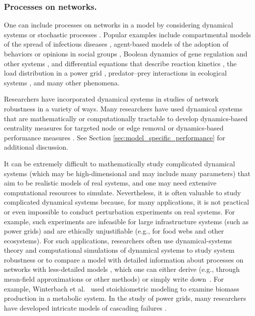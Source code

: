 \documentclass{comnet-mod}
\begin{document}
\subsubsection{Processes on networks.} 

One can include processes on networks in a model by considering dynamical systems or stochastic processes \cite{Porter2016}. Popular examples include compartmental models of the spread of infectious diseases \cite{Pastor-Satorras2015}, agent-based models of the adoption of behaviors or opinions in social groups \cite{noor2020}, Boolean dynamics of gene regulation and other systems \cite{Albert2004a, Schwab2020} ,
and differential equations that describe reaction kinetics \cite{Winterbach2011}, the load distribution in a power grid \cite{Cuadra2015}, predator--prey interactions in ecological systems \cite{Jordan2004}, and many other phenomena. 

Researchers have incorporated dynamical systems in studies of network robustness in a variety of ways. Many researchers have used dynamical systems that are mathematically or computationally tractable to develop dynamics-based centrality measures \cite{Freeman1991, Brandes2005, Newman2005, Konschake2013} for targeted node or edge removal or dynamics-based performance measures \cite{Wu2010, Ellens2011, Schwab2020}. 
See Section \ref{sec:model_specific_performance} for additional discussion.

It can be extremely difficult to mathematically study complicated dynamical systems (which may be high-dimensional and may include many parameters) that aim to be realistic models of real systems, and one may need extensive
 computational resources to simulate. Nevertheless, it is often valuable to 
 study complicated dynamical systems because, for many applications, it is not practical or even impossible to conduct perturbation experiments on real systems. For example, such experiments are infeasible for large infrastructure systems (such as power grids)
 and are ethically unjustifiable (e.g., for food webs and other ecosystems). 
For such applications, researchers often use dynamical-systems theory \cite{May1972, Allesina2012, Medeiros2021} and computational simulations of dynamical systems to study system robustness \cite{Carreras2002, Nedic2006, Carreras2013, Rezaei2014, Henneaux2015, Song2015} or to compare a model with detailed information about processes on networks with less-detailed models \cite{Winterbach2011, Cuadra2015}, which one can either derive (e.g., through mean-field approximations or other methods) or simply write down~\cite{Porter2016}. For example, Winterbach et al.~\cite{Winterbach2011}
used stoichiometric modeling to examine biomass production in a metabolic system. In the study of power grids, many researchers have developed intricate models of
cascading failures \cite{Carreras2002, Nedic2006, Carreras2013, Rezaei2014, Cuadra2015, Henneaux2015, Song2015}. 
\end{document}
